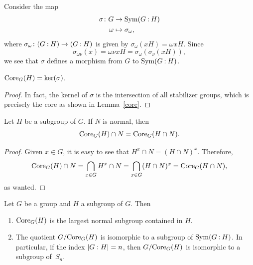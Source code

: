 \begin{rem}\label{G-to-Sym(X)}
    Consider the map
    \begin{align*}
        \sigma\colon G&\to{\rm Sym}(G\mathbin:H)\\
        \omega&\mapsto\sigma_{\omega},
    \end{align*}
    where $\sigma_\omega\colon (G\mathbin:H)\to(G\mathbin:H)$ is given by $\sigma_\omega(xH)=\omega xH$. Since
    $$
        \sigma_{\omega\nu}(x) = \omega\nu xH = \sigma_\omega(\sigma_\nu(xH)),
    $$
    we see that $\sigma$ defines a morphism from $G$ to ${\rm Sym}(G\mathbin:H)$.
\end{rem}


\begin{lem}\label{core=ker}
    ${\rm Core}_G(H)=\ker(\sigma)$.
\end{lem}

\begin{proof}     
    In fact, the kernel of $\sigma$ is the intersection of all stabilizer groups, which is precisely the core as shown in {\upshape Lemma~\ref{core}}.  \end{proof}

\begin{prop}\label{core-cap-normal}
    Let\/ $H$ be a subgroup of\/ $G$. If\/ $N$ is normal, then
    $$
        {\rm Core}_G(H)\cap N= {\rm Core}_G(H\cap N).
    $$
\end{prop}

\begin{proof} Given $x\in G$, it is easy to see that $H^x\cap N=(H\cap N)^x$. Therefore,
$$
    {\rm Core}_G(H)\cap N = \bigcap_{x\in G}H^x\cap N = \bigcap_{x\in G}(H\cap N)^x
        ={\rm Core}_G(H\cap N),
$$
as wanted.  \end{proof}

\begin{thm}\label{largest-normal-subgroup}
    Let $G$ be a group and\/ $H$ a subgroup of\/ $G$. Then
    \begin{enumerate}[\upshape a)]
        \item ${\rm Core}_G(H)$ is the largest normal subgroup contained in $H$.
        \item The quotient $G/{\rm Core}_G(H)$ is isomorphic to a subgroup of\/ ${\rm Sym}(G\mathbin:H)$. In particular, if the index $\left\vert{G:H}\right\vert=n$, then $G/{\rm Core}_G(H)$ is isomorphic to a subgroup of\/~$S_n$.
    \end{enumerate}
\end{thm}


